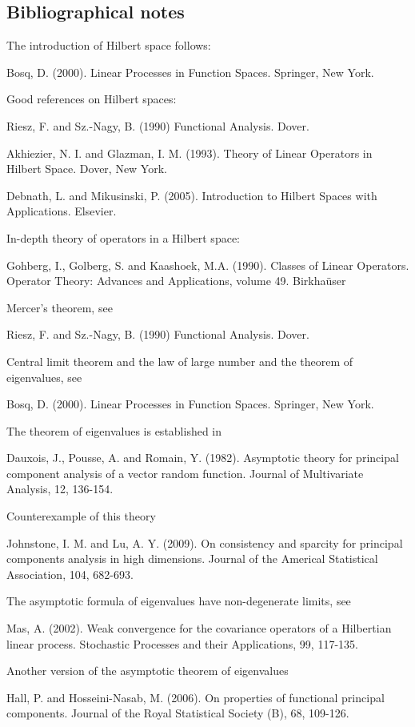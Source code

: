 \subsection{Bibliographical notes}

The introduction of Hilbert space follows:

Bosq, D. (2000). Linear Processes in Function Spaces. Springer, New York.

Good references on Hilbert spaces:

Riesz, F. and Sz.-Nagy, B. (1990) Functional Analysis. Dover.

Akhiezier, N. I. and Glazman, I. M. (1993). Theory of Linear Operators in Hilbert Space. Dover, New York.

Debnath, L. and Mikusinski, P. (2005). Introduction to Hilbert Spaces with Applications. Elsevier.

In-depth theory of operators in a Hilbert space:

Gohberg, I., Golberg, S. and Kaashoek, M.A. (1990). Classes of Linear Operators. Operator Theory: Advances and Applications, volume 49. Birkha\"{u}ser

Mercer's theorem, see

Riesz, F. and Sz.-Nagy, B. (1990) Functional Analysis. Dover.

Central limit theorem and the law of large number and the theorem of eigenvalues, see

Bosq, D. (2000). Linear Processes in Function Spaces. Springer, New York.

The theorem of eigenvalues is established in

Dauxois, J., Pousse, A. and Romain, Y. (1982). Asymptotic theory for principal component analysis of a vector random function. Journal of Multivariate Analysis, 12, 136-154.

Counterexample of this theory

Johnstone, I. M. and Lu, A. Y. (2009). On consistency and sparcity for principal components analysis in high dimensions. Journal of the Americal Statistical Association, 104, 682-693.

The asymptotic formula of eigenvalues have non-degenerate limits, see

Mas, A. (2002). Weak convergence for the covariance operators of a Hilbertian linear process. Stochastic Processes and their Applications, 99, 117-135.

Another version of the asymptotic theorem of eigenvalues

Hall, P. and Hosseini-Nasab, M. (2006). On properties of functional principal components. Journal of the Royal Statistical Society (B), 68, 109-126.

